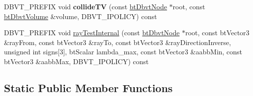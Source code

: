 \begin{DoxyCompactItemize}
D\+B\+V\+T\+\_\+\+P\+R\+E\+F\+IX void {\bfseries collide\+TV} (const \hyperlink{structbtDbvtNode}{bt\+Dbvt\+Node} $\ast$root, const \hyperlink{structbtDbvtAabbMm}{bt\+Dbvt\+Volume} \&volume, D\+B\+V\+T\+\_\+\+I\+P\+O\+L\+I\+CY) const
\item 
D\+B\+V\+T\+\_\+\+P\+R\+E\+F\+IX void \hyperlink{structbtDbvt_a0704881c8799d5326308a6bf210fdfd3}{ray\+Test\+Internal} (const \hyperlink{structbtDbvtNode}{bt\+Dbvt\+Node} $\ast$root, const bt\+Vector3 \&ray\+From, const bt\+Vector3 \&ray\+To, const bt\+Vector3 \&ray\+Direction\+Inverse, unsigned int signs\mbox{[}3\mbox{]}, bt\+Scalar lambda\+\_\+max, const bt\+Vector3 \&aabb\+Min, const bt\+Vector3 \&aabb\+Max, D\+B\+V\+T\+\_\+\+I\+P\+O\+L\+I\+CY) const
\end{DoxyCompactItemize}
\subsection*{Static Public Member Functions}
